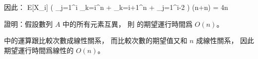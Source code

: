 因此：
\startformula
E[X_i]  \left(
       \sum_{j=1}^i \sum_{k=i}^n  +
       \sum_{k=i+1}^n  +
       \sum_{j=1}^{i-2} 
       \right) (n+n) = 4n
\stopformula
\stopANSWER

\startigBase[continue]\startitem
證明：假設數列 $A$ 中的所有元素互異，
則  的期望運行時間爲 $O(n)$。
\stopitem\stopigBase

\startANSWER
{} 中的運算跟比較次數成線性關系，
而比較次數的期望值又和 $n$ 成線性關系，
因此期望運行時間爲線性的 $O(n)$。
\stopANSWER

\stopPROBLEM
